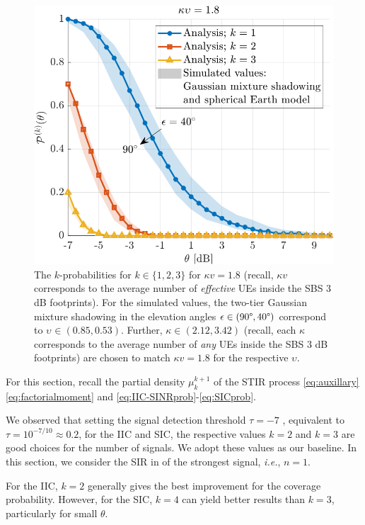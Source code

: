 \documentclass[lettersize,journal]{IEEEtran}
\begin{document}
\begin{figure}[h]
  \centering
  \includegraphics[width=\linewidth]{kprobabilities.pdf}
  \caption{The $k$-probabilities for $k \in \{1,2,3\}$ for $\kappa v=1.8$ (recall, $\kappa v$ corresponds to the average number of \textit{effective} UEs inside the SBS $3$ dB footprints). For the simulated values, the two-tier Gaussian mixture shadowing in the elevation angles $\epsilon \in (90 \degree, 40 \degree)$ correspond to $\upsilon_{} \in (0.85,0.53)$. Further, ${\kappa} \in (2.12,3.42)$ (recall, each $\kappa$ corresponds to the average number of \textit{any} UEs inside the SBS $3$ dB footprints) are chosen to match $\kappa v =1.8$ for the respective $\upsilon$.
} 
  \label{fig:antennapats}
\end{figure}


For this section, recall the partial density $\mu_k^{k+1}$ of the STIR process \eqref{eq:auxillary} \eqref{eq:factorialmoment} and \eqref{eq:IIC-SINRprob}-\eqref{eq:SICprob}.

We observed that setting the signal detection threshold $\tau = -7$ , equivalent to $\tau = 10^{-7/10} \approx 0.2$, for the IIC and SIC, the respective values $k = 2$ and $k=3$ are good choices for the number of signals. We adopt these values as our baseline. In this section, we consider the SIR in of the strongest signal, \textit{i.e.}, $n=1$.

For the IIC, $k = 2$ generally gives the best improvement for the coverage probability. However, for the SIC, $k = 4$ can yield better results than $k = 3$, particularly for small $\theta$.  
\end{document}
